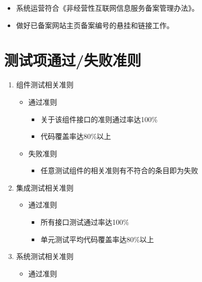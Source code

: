 \documentclass[hyperref, a4paper]{ctexart}
\providecommand{\tightlist}{%
  \setlength{\itemsep}{0pt}\setlength{\parskip}{0pt}}
\begin{document}
\begin{itemize}
\tightlist
\item
  系统运营符合《非经营性互联网信息服务备案管理办法》。
\item
  做好已备案网站主页备案编号的悬挂和链接工作。
\end{itemize}

\hypertarget{ux6d4bux8bd5ux9879ux901aux8fc7ux5931ux8d25ux51c6ux5219}{%
\section{测试项通过/失败准则}\label{ux6d4bux8bd5ux9879ux901aux8fc7ux5931ux8d25ux51c6ux5219}}

\begin{enumerate}
\def\labelenumi{\arabic{enumi}.}
\tightlist
\item
  组件测试相关准则

  \begin{itemize}
  \tightlist
  \item
    通过准则

    \begin{itemize}
    \tightlist
    \item
      关于该组件接口的准则通过率达100\%
    \item
      代码覆盖率达80\%以上
    \end{itemize}
  \item
    失败准则

    \begin{itemize}
    \tightlist
    \item
      任意测试组件的相关准则有不符合的条目即为失败
    \end{itemize}
  \end{itemize}
\item
  集成测试相关准则

  \begin{itemize}
  \tightlist
  \item
    通过准则

    \begin{itemize}
    \tightlist
    \item
      所有接口测试通过率达100\%
    \item
      单元测试平均代码覆盖率达80\%以上
    \end{itemize}
  \end{itemize}
\item
  系统测试相关准则

  \begin{itemize}
  \tightlist
  \item
    通过准则


\end{itemize}
\end{enumerate}
\end{document}
